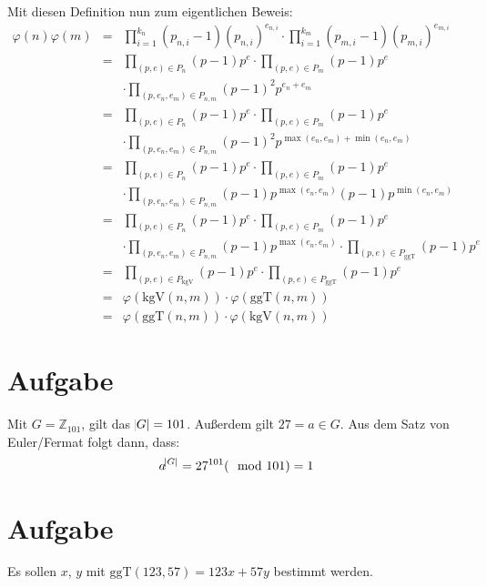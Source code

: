 \documentclass[DIN, pagenumber=false, fontsize=11pt, parskip=half]{scrartcl}
\begin{document}
\begin{enumerate}[label=(\roman*)]
            Mit diesen Definition nun zum eigentlichen Beweis:
            \begin{eqnarray}
                \varphi(n) \varphi(m) &=& \prod_{i=1}^{k_n} (p_{n,i}-1) {(p_{n,i})}^{e_{n,i}} \cdot \prod_{i=1}^{k_m} (p_{m,i}-1) {(p_{m,i})}^{e_{m,i}} \\
                    &=& \prod_{(p, e) \in P_n} (p-1) p^e \cdot \prod_{(p,e) \in P_m} (p-1) p^e \\
                    && \cdot \prod_{(p, e_n, e_m) \in P_{n, m}} {(p-1)}^2 p^{e_n + e_m} \\
                    &=& \prod_{(p, e) \in P_n} (p-1) p^e \cdot \prod_{(p,e) \in P_m} (p-1) p^e \\
                    && \cdot \prod_{(p, e_n, e_m) \in P_{n, m}} {(p-1)}^2 p^{\max(e_n, e_m) + \min(e_n, e_m)} \\
                    &=& \prod_{(p, e) \in P_n} (p-1) p^e \cdot \prod_{(p,e) \in P_m} (p-1) p^e \\
                    && \cdot \prod_{(p, e_n, e_m) \in P_{n, m}} (p-1) p^{\max(e_n, e_m)} (p-1) p^{\min(e_n, e_m)} \\
                    &=& \prod_{(p, e) \in P_n} (p-1) p^e \cdot \prod_{(p,e) \in P_m} (p-1) p^e \\
                    && \cdot \prod_{(p, e_n, e_m) \in P_{n, m}} (p-1) p^{\max(e_n, e_m)} \cdot \prod_{(p,e) \in P_\text{ggT}}  (p-1) p^e \\
                    &=& \prod_{(p,e) \in P_\text{kgV}} (p-1) p^e \cdot \prod_{(p,e) \in P_\text{ggT}}  (p-1) p^e \\
                    &=& \varphi(\text{kgV}(n, m)) \cdot \varphi(\text{ggT}(n, m)) \\
                    &=& \varphi(\text{ggT}(n, m)) \cdot \varphi(\text{kgV}(n, m))
            \end{eqnarray}
    \end{enumerate}

    \section{Aufgabe}
    Mit $G = \mathbb{Z}_{101}$, gilt das $\abs{G} = 101$. Außerdem gilt $27 = a \in G$.
    Aus dem Satz von Euler/Fermat folgt dann, dass:
    \begin{equation}
        a^{\abs{G}} = 27^{101} (\mod 101)  = 1
    \end{equation}

    \section{Aufgabe}
    Es sollen $x$, $y$ mit $\text{ggT}(123, 57) = 123x + 57y$ bestimmt werden.
\end{document}
